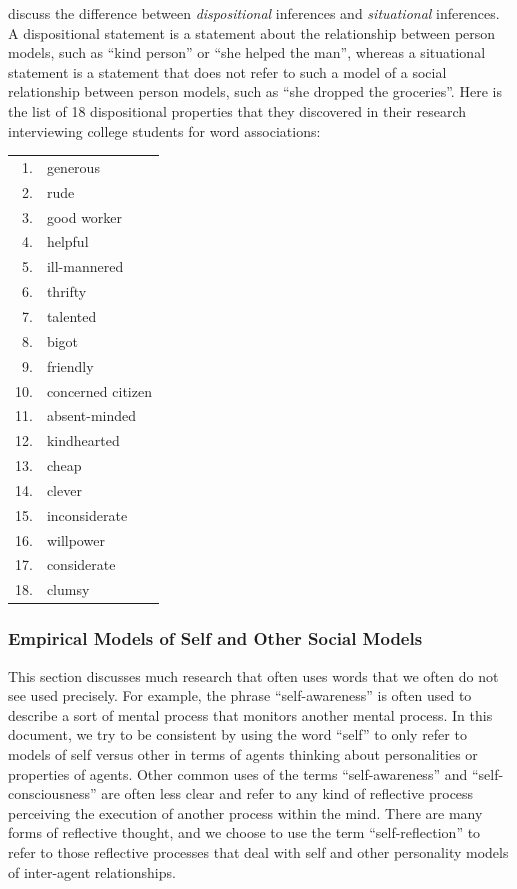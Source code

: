 \cite{winter2005wasjm} discuss the difference between \emph{dispositional} inferences and \emph{situational} inferences.
A dispositional statement is a statement about the relationship between person models, such as ``kind person'' or ``she helped the man'', whereas a situational statement is a statement that does not refer to such a model of a social relationship between person models, such as ``she dropped the groceries''.
Here is the list of 18 dispositional properties that they discovered in their research interviewing college students for word associations:

\begin{tabular}{rl}
  1. & generous          \\
  2. & rude              \\
  3. & good worker       \\
  4. & helpful           \\
  5. & ill-mannered      \\
  6. & thrifty           \\
  7. & talented          \\
  8. & bigot             \\
  9. & friendly          \\
  10. & concerned citizen \\
  11. & absent-minded     \\
  12. & kindhearted       \\
  13. & cheap             \\
  14. & clever            \\
  15. & inconsiderate     \\
  16. & willpower         \\
  17. & considerate       \\
  18. & clumsy
\end{tabular}

\subsubsection{Empirical Models of Self and Other Social Models}

This section discusses much research that often uses words that we often do not see used precisely.
For example, the phrase ``self-awareness'' is often used to describe a sort of mental process that monitors another mental process.
In this document, we try to be consistent by using the word ``self'' to only refer to models of self versus other in terms of agents thinking about personalities or properties of agents.
Other common uses of the terms ``self-awareness'' and ``self-consciousness'' are often less clear and refer to any kind of reflective process perceiving the execution of another process within the mind.
There are many forms of reflective thought, and we choose to use the term ``self-reflection'' to refer to those reflective processes that deal with self and other personality models of inter-agent relationships.

